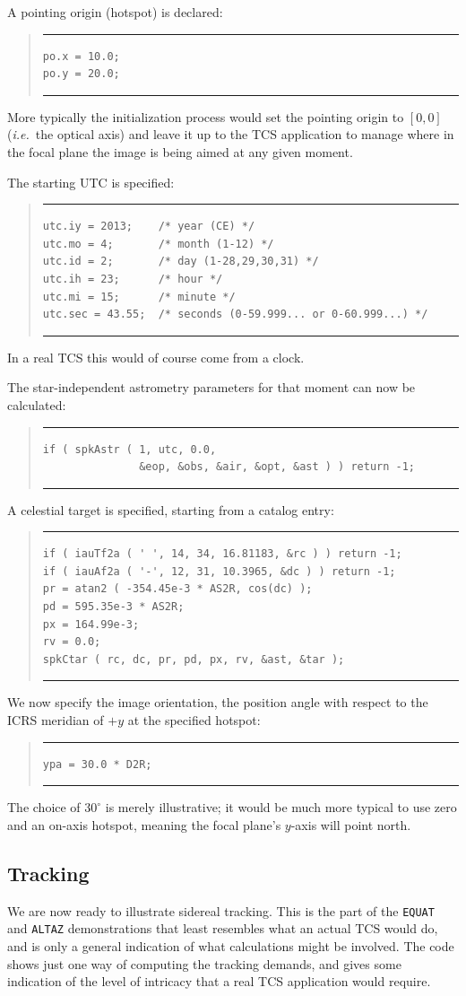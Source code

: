 \documentclass[11pt,fleqn,twoside,\paper]{article}
\renewcommand{\_}{{\tt\char'137}}     %
\newcommand{\degi}[1]   {$#1^{\circ}$}
\newcommand{\scode}     {\goodbreak
                         \begin{quote}
                         \vspace{-6ex}
                         \rule[-2ex]{36em}{0.03ex}}
\newcommand{\ecode}     {\rule[2ex]{36em}{0.03ex}
                         \end{quote}
                         \vspace{-4ex}
                         \goodbreak}
\begin{document}
A pointing origin (hotspot) is declared:
\scode\begin{verbatim}
po.x = 10.0;
po.y = 20.0;
\end{verbatim}\ecode
More typically the initialization process would set the pointing
origin to $[0,0]$ ({\it i.e.}~the optical axis) and leave it up
to the TCS application to manage where in the focal plane the
image is being aimed at any given moment.

The starting UTC is specified:
\scode\begin{verbatim}
utc.iy = 2013;    /* year (CE) */
utc.mo = 4;       /* month (1-12) */
utc.id = 2;       /* day (1-28,29,30,31) */
utc.ih = 23;      /* hour */
utc.mi = 15;      /* minute */
utc.sec = 43.55;  /* seconds (0-59.999... or 0-60.999...) */
\end{verbatim}\ecode
In a real TCS this would of course come from a clock.

The star-independent astrometry parameters for that moment can
now be calculated:
\scode\begin{verbatim}
if ( spkAstr ( 1, utc, 0.0,
               &eop, &obs, &air, &opt, &ast ) ) return -1;
\end{verbatim}\ecode
A celestial target is specified, starting from a catalog entry:
\scode\begin{verbatim}
if ( iauTf2a ( ' ', 14, 34, 16.81183, &rc ) ) return -1;
if ( iauAf2a ( '-', 12, 31, 10.3965, &dc ) ) return -1;
pr = atan2 ( -354.45e-3 * AS2R, cos(dc) );
pd = 595.35e-3 * AS2R;
px = 164.99e-3;
rv = 0.0;
spkCtar ( rc, dc, pr, pd, px, rv, &ast, &tar );
\end{verbatim}\ecode
We now specify the image orientation, the position angle
with respect to the ICRS meridian of $+y$ at the specified hotspot:
\scode\begin{verbatim}
ypa = 30.0 * D2R;
\end{verbatim}\ecode
The choice of \degi{30} is merely illustrative;  it would be
much more typical to use zero and an on-axis hotspot, meaning
the focal plane's $y$-axis will point north.

\subsection{Tracking}
We are now ready to illustrate sidereal tracking.  This
is the part of the {\tt EQUAT} and {\tt ALTAZ}
demonstrations that least resembles what an
actual TCS would do, and is only a general indication of what
calculations might be involved.  The code shows just one way of
computing the tracking
demands, and gives some indication of the level of intricacy that a
real TCS application would require.
\end{document}
